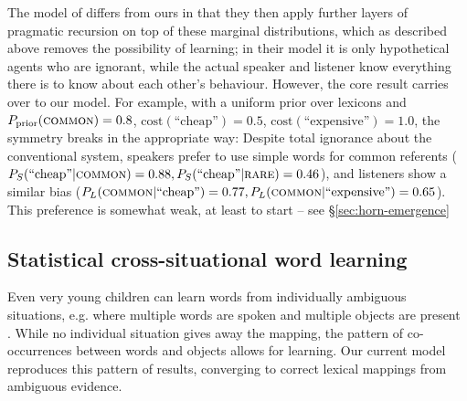 \documentclass{article} %
\begin{document}
The model of \cite{bergen2012} differs from ours in that they then apply further layers of pragmatic recursion on top of these marginal distributions, which as described above removes the possibility of learning; in their model it is only hypothetical agents who are ignorant, while the actual speaker and listener know everything there is to know about each other's behaviour. However, the core result carries over to our model. For example, with a uniform prior over lexicons and $P_\text{prior}(\text{\textsc{common}}) = 0.8$, $\text{cost}(\text{``cheap''}) = 0.5$, $\text{cost}(\text{``expensive''}) = 1.0$, the symmetry breaks in the appropriate way: Despite total ignorance about the conventional system, speakers prefer to use simple words for common referents ($P_S(\text{``cheap''} | \text{\textsc{common}}) = 0.88, P_S(\text{``cheap''} | \text{\textsc{rare}}) = 0.46$), and listeners show a similar bias ($P_L(\text{\textsc{common}} | \text{``cheap''}) = 0.77, P_L(\text{\textsc{common}} | \text{``expensive''}) = 0.65$). This preference is somewhat weak, at least to start -- see \S\ref{sec:horn-emergence}

\subsection{Statistical cross-situational word learning}

Even very young children can learn words from individually ambiguous situations, e.g. where multiple words are spoken and multiple objects are present \cite{smith2008}. While no individual situation gives away the mapping, the pattern of co-occurrences between words and objects allows for learning. Our current model reproduces this pattern of results, converging to correct lexical mappings from ambiguous evidence. 


\end{document}
